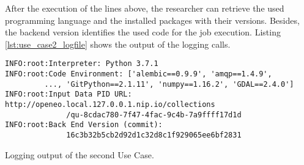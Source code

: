 \documentclass[draft,final]{vutinfth} %
\newenvironment{code}{\captionsetup{type=listing}}{}
\begin{document}
\begin{enumerate}
	After the execution of the lines above, the researcher can retrieve the used programming language and the installed packages with their versions. Besides, the backend version identifies the used code for the job execution. Listing \ref{lst:use_case2_logfile} shows the output of the logging calls.  
	
\end{enumerate}

\begin{code}
	\begin{verbatim}
INFO:root:Interpreter: Python 3.7.1
INFO:root:Code Environment: ['alembic==0.9.9', 'amqp==1.4.9',
         ..., 'GitPython==2.1.11', 'numpy==1.16.2', 'GDAL==2.4.0']
INFO:root:Input Data PID URL:
http://openeo.local.127.0.0.1.nip.io/collections
              /qu-8cdac780-7f47-4fac-9c4b-7a9ffff17d1d
INFO:root:Back End Version (commit): 
              16c3b32b5cb2d92d1c32d8c1f929065ee6bf2831
	\end{verbatim}
	\caption{Logging output of the second Use Case.}
	\label{lst:use_case2_logfile}
\end{code}
\end{document}
